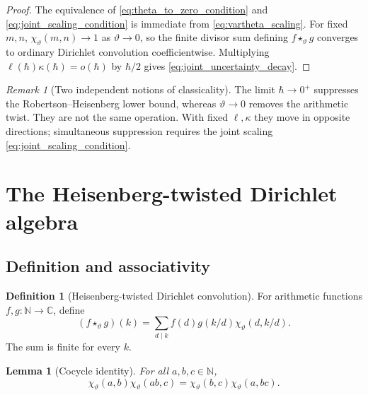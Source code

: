 \documentclass[11pt]{amsart}
\numberwithin{equation}{section}
\theoremstyle{plain}
\newtheorem{lemma}[theorem]{Lemma}
\theoremstyle{definition}
\newtheorem{definition}[theorem]{Definition}
\theoremstyle{remark}
\newtheorem{remark}[theorem]{Remark}
\newcommand{\C}{\mathbb{C}}
\newcommand{\N}{\mathbb{N}}
\newcommand{\twconv}{\star_{\vartheta}}
\begin{document}
\begin{proof}
The equivalence of \eqref{eq:theta_to_zero_condition} and
\eqref{eq:joint_scaling_condition} is immediate from
\eqref{eq:vartheta_scaling}.  For fixed \(m,n\),
\(\chi_{\vartheta}(m,n)\to1\) as \(\vartheta\to0\), so the
finite divisor sum defining \(f\star_{\vartheta}g\) converges to ordinary
Dirichlet convolution coefficientwise.  Multiplying
\(\ell(\hbar)\kappa(\hbar)=o(\hbar)\) by \(\hbar/2\) gives
\eqref{eq:joint_uncertainty_decay}.
\end{proof}

\begin{remark}[Two independent notions of classicality]
\label{rem:two_classicalities}
The limit \(\hbar\to0^+\) suppresses the Robertson--Heisenberg lower
bound, whereas \(\vartheta\to0\) removes the arithmetic twist.  They are
not the same operation.  With fixed \(\ell,\kappa\) they move in opposite
directions; simultaneous suppression requires the joint scaling
\eqref{eq:joint_scaling_condition}.
\end{remark}

\section{The Heisenberg-twisted Dirichlet algebra}
\label{sec:twisted_dirichlet_algebra}

\subsection{Definition and associativity}
\label{subsec:twisted_convolution_definition}

\begin{definition}[Heisenberg-twisted Dirichlet convolution]
\label{def:twisted_convolution}
For arithmetic functions $f,g:\N\to\C$, define
\begin{equation}
(f\twconv g)(k)
=
\sum_{d\mid k}
f(d)g(k/d)\chi_{\vartheta}(d,k/d).
\label{eq:twisted_convolution}
\end{equation}
The sum is finite for every $k$.
\end{definition}

\begin{lemma}[Cocycle identity]
\label{lem:cocycle_identity}
For all $a,b,c\in\N$,
\begin{equation}
\chi_{\vartheta}(a,b)\chi_{\vartheta}(ab,c)
=
\chi_{\vartheta}(b,c)\chi_{\vartheta}(a,bc).
\label{eq:cocycle_identity}
\end{equation}
\end{lemma}
\end{document}
